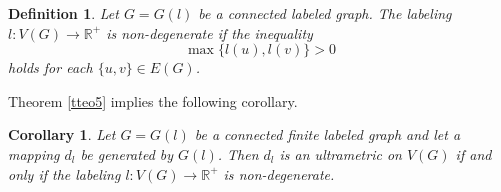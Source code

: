 \documentclass[pdflatex,sn-mathphys-num]{sn-jnl}%
\theoremstyle{thmstyleone}%
\newtheorem{Corollary}[Theorem]{Corollary}
\theoremstyle{thmstyletwo}%
\theoremstyle{thmstylethree}%
\newtheorem{Definition}[Theorem]{Definition}
\theoremstyle{thmstyletwo}%
\theoremstyle{thmstylethree}%
\begin{document}
\begin{Definition}\label{maks}
    Let $G=G(l)$ be a connected labeled graph. The 
labeling 
\(
l : V(G) \to \mathbb{R}^+
\)
is {\it non-degenerate} if the inequality
\[
\max \{ l(u), l(v) \} > 0
\]
holds for each $\{u,v\} \in E(G)$.
\end{Definition}



Theorem \ref{tteo5} implies the following corollary.








\begin{Corollary}\label{esghkl}
    Let $G = G(l)$ be a connected finite labeled graph  and let a mapping $d_l $
be generated by $G(l)$.
Then $d_l$ is an ultrametric on $V(G)$ if and only if the labeling 
\(
l : V(G) \to \mathbb{R}^+
\)
is {\it non-degenerate}.
\end{Corollary}
\end{document}
